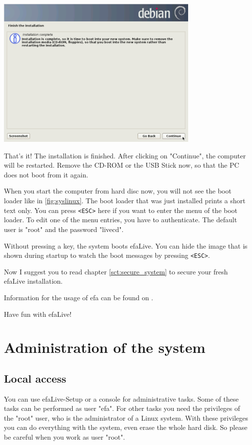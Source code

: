 \documentclass[a4paper,12pt,twoside]{article}
\begin{document}
\begin{minipage}{\linewidth}
    \centering
    \includegraphics[width=10cm]{efaLiveen-img/efaLiveen-img19.png}
    \label{fig:finish}
\end{minipage}

That's it! The installation is finished. After clicking
on "Continue", the computer will be
restarted. Remove the CD-ROM or the USB Stick now, so that the PC does
not boot from it again.

When you start the computer from hard disc now, you will not see the
boot loader like in \ref{fig:syslinux}. The boot loader that was just
installed prints a short text only. You can press
\texttt{{\textless}ESC{\textgreater}} here if you want to enter the menu of the
boot loader. To edit one of the menu entries, you have to authenticate.
The default user is "root" and the password "livecd".

Without pressing a key, the system boots efaLive. You can hide the image
that is shown during startup to watch the boot messages by pressing
\texttt{{\textless}ESC{\textgreater}}.

Now I suggest you to read chapter \ref{sct:secure_system} to
secure your fresh efaLive installation.

\bigskip
Information for the usage of efa can be found on \cite{EFA2}.

\bigskip
Have fun with efaLive!


\section{Administration of the system}
\label{sct:administration}
\subsection{Local access}
\label{sct:local_access}
You can use efaLive-Setup or a console for
administrative tasks. Some of these tasks can be performed as user
"efa". For other tasks you need the
privileges of the "root" user, who is the
administrator of a Linux system. With these privileges you can do
everything with the system, even erase the whole hard disk. So please
be careful when you work as user "root".
\end{document}
